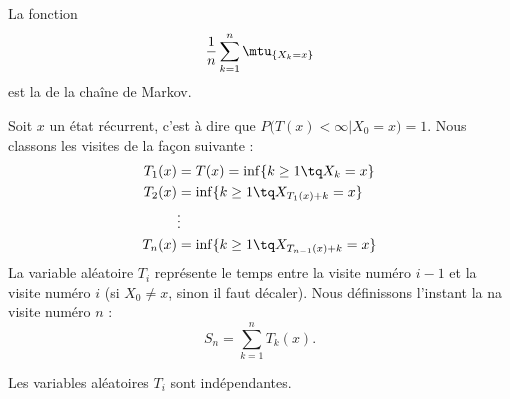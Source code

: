 La fonction
\begin{equation}
    \frac{1}{ n }\sum_{k=1}^n\mtu_{\{ X_k=x \}}
\end{equation}
est la  de la chaîne de Markov.

Soit \( x\) un état récurrent, c'est à dire que \( P\big( T(x)<\infty|X_0=x \big)=1\). Nous classons les visites de la façon suivante :
\begin{subequations}    \label{SubEqsDefTirectempsretou}
    \begin{align}
        T_1(x)&=T(x)=\inf\{ k\geq 1\tq X_k=x \}\\
        T_2(x)&=\inf\{ k\geq 1\tq X_{T_1(x)+k}=x \}\\
        &\vdots\\
        T_n(x)&=\inf\{ k\geq 1\tq X_{T_{n-1}(x)+k}=x \}
    \end{align}
\end{subequations}
La variable aléatoire \( T_i\) représente le temps entre la visite numéro \( i-1\) et la visite numéro \( i\) (si \( X_0\neq x\), sinon il faut décaler). Nous définissons l'instant la na visite numéro \( n\) :
\begin{equation}
    S_n=\sum_{k=1}^nT_k(x).
\end{equation}

\begin{lemma}
    Les variables aléatoires \( T_i\) sont indépendantes.
\end{lemma}

